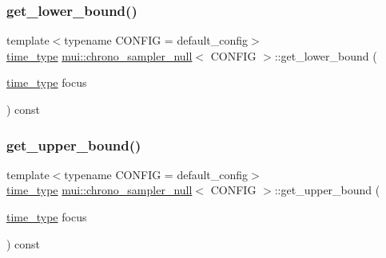 \subsubsection{\texorpdfstring{get\+\_\+lower\+\_\+bound()}{get\_lower\_bound()}}
{\footnotesize\ttfamily template$<$typename C\+O\+N\+F\+IG  = default\+\_\+config$>$ \\
\hyperlink{classmui_1_1chrono__sampler__null_a5a14f1c66478264e3fb50ba4fda7d78c}{time\+\_\+type} \hyperlink{classmui_1_1chrono__sampler__null}{mui\+::chrono\+\_\+sampler\+\_\+null}$<$ C\+O\+N\+F\+IG $>$\+::get\+\_\+lower\+\_\+bound (\begin{DoxyParamCaption}\item[{\hyperlink{classmui_1_1chrono__sampler__null_a5a14f1c66478264e3fb50ba4fda7d78c}{time\+\_\+type}}]{focus }\end{DoxyParamCaption}) const\hspace{0.3cm}{\ttfamily [inline]}}

\mbox{\label{classmui_1_1chrono__sampler__null_a2e62951320912bdde965c14f5bb437ef}} 
\subsubsection{\texorpdfstring{get\+\_\+upper\+\_\+bound()}{get\_upper\_bound()}}
{\footnotesize\ttfamily template$<$typename C\+O\+N\+F\+IG  = default\+\_\+config$>$ \\
\hyperlink{classmui_1_1chrono__sampler__null_a5a14f1c66478264e3fb50ba4fda7d78c}{time\+\_\+type} \hyperlink{classmui_1_1chrono__sampler__null}{mui\+::chrono\+\_\+sampler\+\_\+null}$<$ C\+O\+N\+F\+IG $>$\+::get\+\_\+upper\+\_\+bound (\begin{DoxyParamCaption}\item[{\hyperlink{classmui_1_1chrono__sampler__null_a5a14f1c66478264e3fb50ba4fda7d78c}{time\+\_\+type}}]{focus }\end{DoxyParamCaption}) const\hspace{0.3cm}{\ttfamily [inline]}}

\mbox{\label{classmui_1_1chrono__sampler__null_a3b498cf0cc749864c5e0798301bb9a2c}} 
